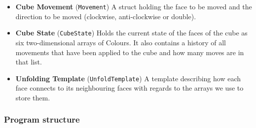 \documentclass[8pt]{article}
\begin{document}
\begin{itemize}

    \item \textbf{Cube Movement} (\texttt{Movement}) A struct holding the face to 
    be moved and the direction to be moved (clockwise, anti-clockwise or double).
    
    \item \textbf{Cube State} (\texttt{CubeState}) Holds the current state of the 
    faces of the cube as six two-dimensional arrays of Colours. It also contains 
    a history of all movements that have been applied to the cube and how many moves
    are in that list.

    \item \textbf{Unfolding Template} (\texttt{UnfoldTemplate}) A template describing 
    how each face connects to its neighbouring faces with regards to the arrays we
    use to store them.
    
\end{itemize}

\subsubsection{Program structure}
\end{document}
